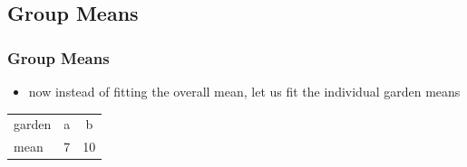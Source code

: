 \subsection{Group Means}
\begin{frame}\frametitle{Group Means}
  \begin{itemize}
  \item now instead of fitting the overall mean, let us fit the individual garden means
  \end{itemize}
\begin{table}[ht]
\centering
\begin{tabular}{lcc}
  \hline
garden & a & b \\ 
  mean &  7 & 10 \\ 
   \hline
\end{tabular}
\end{table}
\end{frame}

